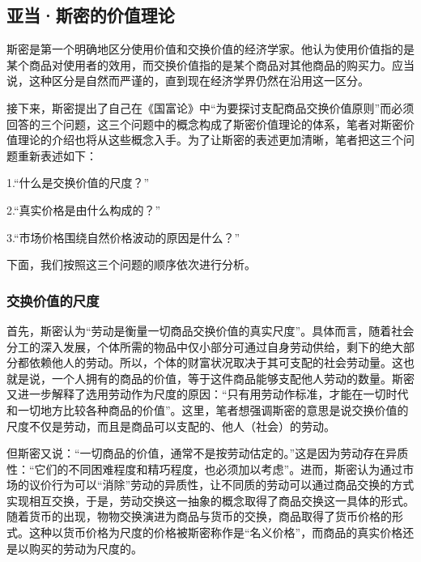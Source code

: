 \subsection{亚当·斯密的价值理论}

斯密是第一个明确地区分使用价值和交换价值的经济学家\cite[122]{CaiJiMingCongGuDianZhengZhiJingJiXueDaoZhongGuoTeSeSheHuiZhuYiZhengZhiJingJiXueJiYuZhongGuoShiJiaoDeZhengZhiJingJiXueYanBianShangCe2023}。他认为使用价值指的是某个商品对使用者的效用，而交换价值指的是某个商品对其他商品的购买力\cite[24]{YaDang*SiMiGuoFuLun2015}。应当说，这种区分是自然而严谨的，直到现在经济学界仍然在沿用这一区分。

接下来，斯密提出了自己在《国富论》中“为要探讨支配商品交换价值原则”\cite[24]{YaDang*SiMiGuoFuLun2015}而必须回答的三个问题，这三个问题中的概念构成了斯密价值理论的体系，笔者对斯密价值理论的介绍也将从这些概念入手。为了让斯密的表述更加清晰，笔者把这三个问题重新表述如下：

1.“什么是交换价值的尺度？”\cite[24]{YaDang*SiMiGuoFuLun2015}

2.“真实价格是由什么构成的？”\cite[24]{YaDang*SiMiGuoFuLun2015}

3.“市场价格围绕自然价格波动的原因是什么？”\cite[24]{YaDang*SiMiGuoFuLun2015}

下面，我们按照这三个问题的顺序依次进行分析。

\subsubsection{交换价值的尺度}

首先，斯密认为“劳动是衡量一切商品交换价值的真实尺度”\Cite[25]{YaDang*SiMiGuoFuLun2015}。具体而言，随着社会分工的深入发展，个体所需的物品中仅小部分可通过自身劳动供给，剩下的绝大部分都依赖他人的劳动。所以，个体的财富状况取决于其可支配的社会劳动量\cite[25]{YaDang*SiMiGuoFuLun2015}。这也就是说，一个人拥有的商品的价值，等于这件商品能够支配他人劳动的数量\cite[25]{YaDang*SiMiGuoFuLun2015}。斯密又进一步解释了选用劳动作为尺度的原因：“只有用劳动作标准，才能在一切时代和一切地方比较各种商品的价值”\cite[31]{YaDang*SiMiGuoFuLun2015}。这里，笔者想强调斯密的意思是说交换价值的尺度不仅是劳动，而且是商品可以支配的、他人（社会）的劳动。

但斯密又说：“一切商品的价值，通常不是按劳动估定的。”\cite[26]{YaDang*SiMiGuoFuLun2015}这是因为劳动存在异质性：“它们的不同困难程度和精巧程度，也必须加以考虑”\cite[26]{YaDang*SiMiGuoFuLun2015}。进而，斯密认为通过市场的议价行为可以“消除”劳动的异质性，让不同质的劳动可以通过商品交换的方式实现相互交换，于是，劳动交换这一抽象的概念取得了商品交换这一具体的形式\cite[26]{YaDang*SiMiGuoFuLun2015}。随着货币的出现，物物交换演进为商品与货币的交换，商品取得了货币价格的形式。这种以货币价格为尺度的价格被斯密称作是“名义价格”，而商品的真实价格还是以购买的劳动为尺度的\cite[28]{YaDang*SiMiGuoFuLun2015}。

